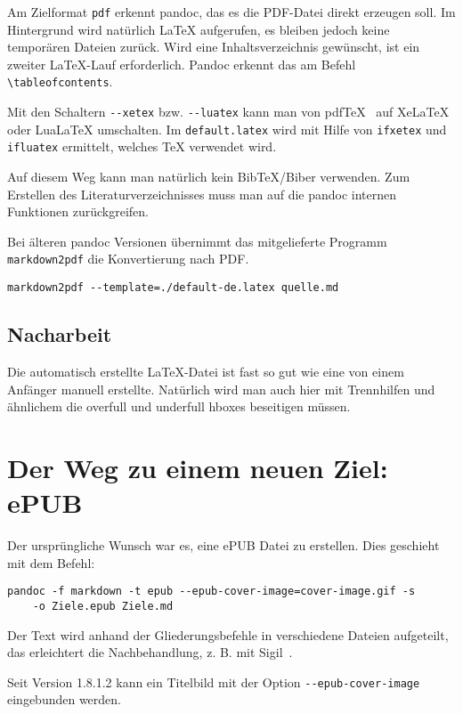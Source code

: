 \documentclass[11pt,ngerman,a4paper]{article}
\begin{document}
Am Zielformat \texttt{pdf} erkennt pandoc, das es die PDF-Datei direkt
erzeugen soll. Im Hintergrund wird natürlich LaTeX aufgerufen, es
bleiben jedoch keine temporären Dateien zurück. Wird eine
Inhaltsverzeichnis gewünscht, ist ein zweiter LaTeX-Lauf erforderlich.
Pandoc erkennt das am Befehl \texttt{\textbackslash{}tableofcontents}.

Mit den Schaltern \texttt{-{}-xetex} bzw. \texttt{-{}-luatex} kann man
von pdfTeX~ auf XeLaTeX oder LuaLaTeX umschalten. Im
\texttt{default.latex} wird mit Hilfe von \texttt{ifxetex} und
\texttt{ifluatex} ermittelt, welches TeX verwendet wird.

Auf diesem Weg kann man natürlich kein BibTeX/Biber verwenden. Zum
Erstellen des Literaturverzeichnisses muss man auf die pandoc internen
Funktionen zurückgreifen.

Bei älteren pandoc Versionen übernimmt das mitgelieferte Programm
\texttt{markdown2pdf} die Konvertierung nach PDF.

\begin{verbatim}
markdown2pdf --template=./default-de.latex quelle.md
\end{verbatim}

\subsection{Nacharbeit}

Die automatisch erstellte LaTeX-Datei ist fast so gut wie eine von einem
Anfänger manuell erstellte. Natürlich wird man auch hier mit Trennhilfen
und ähnlichem die overfull und underfull hboxes beseitigen müssen.

\section{Der Weg zu einem neuen Ziel: ePUB}

Der ursprüngliche Wunsch war es, eine ePUB Datei zu erstellen. Dies
geschieht mit dem Befehl:

\begin{verbatim}
pandoc -f markdown -t epub --epub-cover-image=cover-image.gif -s
    -o Ziele.epub Ziele.md
\end{verbatim}

Der Text wird anhand der Gliederungsbefehle in verschiedene Dateien
aufgeteilt, das erleichtert die Nachbehandlung, z. B. mit
Sigil~\autocite{sigil}.

Seit Version 1.8.1.2 kann ein Titelbild mit der Option
\texttt{-{}-epub-cover-image} eingebunden werden.
\end{document}
